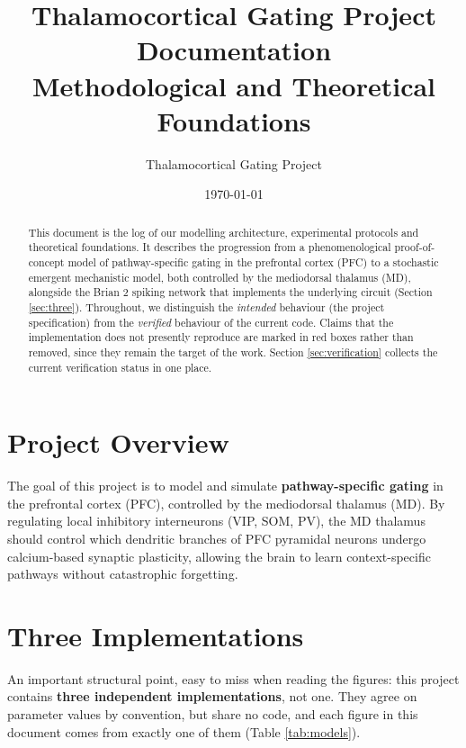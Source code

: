 \documentclass[11pt,a4paper]{article}
\title{Thalamocortical Gating Project Documentation \\
\large Methodological and Theoretical Foundations}
\author{Thalamocortical Gating Project}
\date{\today}
\begin{document}
\maketitle

\begin{abstract}
This document is the log of our modelling architecture, experimental protocols and
theoretical foundations. It describes the progression from a phenomenological
proof-of-concept model of pathway-specific gating in the prefrontal cortex (PFC) to a
stochastic emergent mechanistic model, both controlled by the mediodorsal thalamus
(MD), alongside the Brian 2 spiking network that implements the underlying circuit
(Section \ref{sec:three}).
Throughout, we distinguish the \emph{intended} behaviour (the project specification)
from the \emph{verified} behaviour of the current code. Claims that the implementation
does not presently reproduce are marked in red boxes rather than removed, since they
remain the target of the work. Section \ref{sec:verification} collects the current
verification status in one place.
\end{abstract}

\section{Project Overview}
The goal of this project is to model and simulate \textbf{pathway-specific gating} in
the prefrontal cortex (PFC), controlled by the mediodorsal thalamus (MD). By
regulating local inhibitory interneurons (VIP, SOM, PV), the MD thalamus should control
which dendritic branches of PFC pyramidal neurons undergo calcium-based synaptic
plasticity, allowing the brain to learn context-specific pathways without catastrophic
forgetting.

\section{Three Implementations}
\label{sec:three}
An important structural point, easy to miss when reading the figures: this project
contains \textbf{three independent implementations}, not one. They agree on parameter
values by convention, but share no code, and each figure in this document comes from
exactly one of them (Table \ref{tab:models}).
\end{document}
